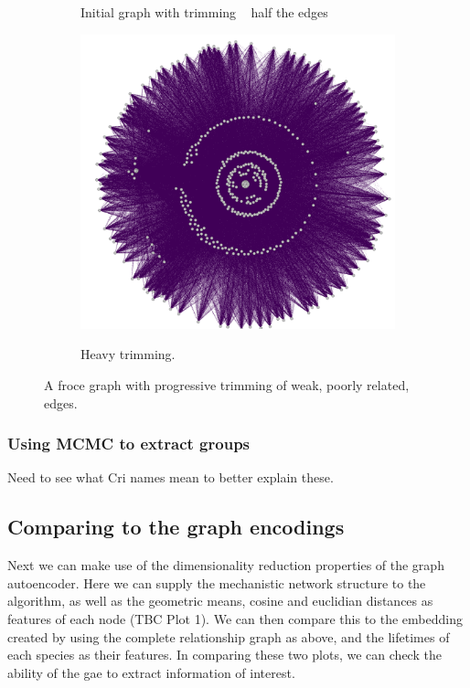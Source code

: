 \documentclass{pasa}%
\begin{document}
\begin{figure}[H]
\begin{subfigure}{.33\textwidth}
  \label{fig:pca}
  \caption{Initial graph with trimming ~ half the edges}
\end{subfigure}%
\begin{subfigure}{.33\textwidth}
  \centering
  \includegraphics[width=\textwidth]{fig/step3.png}
  \label{fig:ae}
  \caption{Heavy trimming.}
\end{subfigure}%


\caption{A froce graph with progressive trimming of weak, poorly related, edges.}
\end{figure}

\subsubsection{Using MCMC to extract groups}

Need to see what Cri names mean to better explain these. 


\subsection{Comparing to the graph encodings}

Next we can make use of the dimensionality reduction properties of the graph autoencoder. Here we can supply the mechanistic network structure to the algorithm, as well as the geometric means, cosine and euclidian distances as features of each node (TBC Plot 1). We can then compare this to the embedding created by using the complete relationship graph as above, and the lifetimes of each species as their features. In comparing these two plots, we can check the ability of the gae to extract information of interest. 
\end{document}
